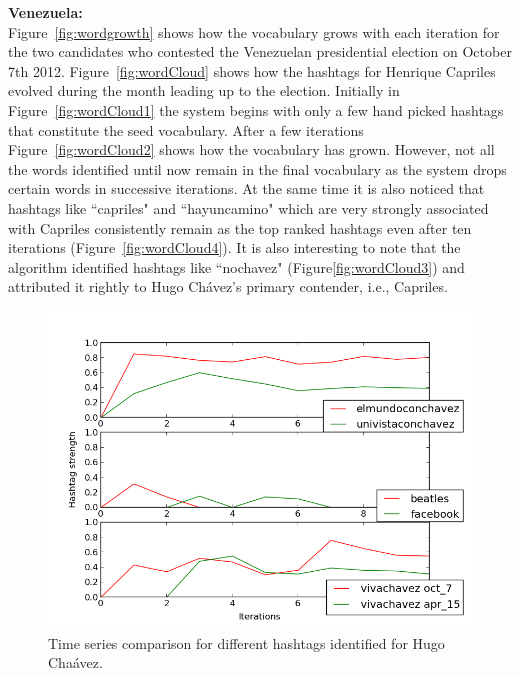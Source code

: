 \noindent
{\bf Venezuela:} \\
Figure~\ref{fig:wordgrowth} shows  how the vocabulary grows with each iteration for the two candidates who contested the Venezuelan presidential election on October 7th 2012.
Figure~\ref{fig:wordCloud} shows how the hashtags for Henrique Capriles evolved during the month leading up to the election.
Initially in Figure~\ref{fig:wordCloud1} the system begins with only a few hand picked hashtags that constitute the seed vocabulary. 
After a few iterations Figure~\ref{fig:wordCloud2} shows how the vocabulary has grown.
However, not all the words identified until now remain in the final vocabulary as the system drops certain words in successive iterations.
At the same time it is also noticed that hashtags like ``capriles" and ``hayuncamino" which are very strongly associated with Capriles consistently remain as the top ranked hashtags even after ten iterations (Figure~\ref{fig:wordCloud4}). 
It is also interesting to note that the algorithm identified hashtags like ``nochavez" (Figure\ref{fig:wordCloud3}) and attributed it rightly to Hugo Ch\'{a}vez's primary contender, i.e., Capriles. \\
\begin{figure}[Ht]
	\centering
	\includegraphics[scale=0.65]{support_files/hashTagTimeSeries.png}
	\caption{Time series comparison for different hashtags identified for Hugo Cha\'{a}vez.}
	\label{fig:timeSeries}
\end{figure}
